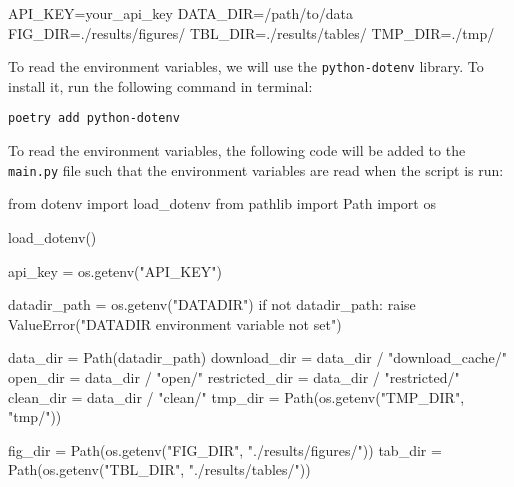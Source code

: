 \documentclass[
  letterpaper,
  DIV=11,
  numbers=noendperiod]{scrartcl}
\newenvironment{Shaded}{\begin{snugshade}}{\end{snugshade}}
\newcommand{\ControlFlowTok}[1]{\textcolor[rgb]{0.00,0.23,0.31}{#1}}
\newcommand{\ImportTok}[1]{\textcolor[rgb]{0.00,0.46,0.62}{#1}}
\newcommand{\KeywordTok}[1]{\textcolor[rgb]{0.00,0.23,0.31}{#1}}
\newcommand{\NormalTok}[1]{\textcolor[rgb]{0.00,0.23,0.31}{#1}}
\newcommand{\OperatorTok}[1]{\textcolor[rgb]{0.37,0.37,0.37}{#1}}
\newcommand{\PreprocessorTok}[1]{\textcolor[rgb]{0.68,0.00,0.00}{#1}}
\newcommand{\StringTok}[1]{\textcolor[rgb]{0.13,0.47,0.30}{#1}}
\begin{document}
\begin{Shaded}
\begin{Highlighting}[]
\NormalTok{API\_KEY}\OperatorTok{=}\NormalTok{your\_api\_key}
\NormalTok{DATA\_DIR}\OperatorTok{=/}\NormalTok{path}\OperatorTok{/}\NormalTok{to}\OperatorTok{/}\NormalTok{data}
\NormalTok{FIG\_DIR}\OperatorTok{=}\NormalTok{.}\OperatorTok{/}\NormalTok{results}\OperatorTok{/}\NormalTok{figures}\OperatorTok{/}
\NormalTok{TBL\_DIR}\OperatorTok{=}\NormalTok{.}\OperatorTok{/}\NormalTok{results}\OperatorTok{/}\NormalTok{tables}\OperatorTok{/}
\NormalTok{TMP\_DIR}\OperatorTok{=}\NormalTok{.}\OperatorTok{/}\NormalTok{tmp}\OperatorTok{/}
\end{Highlighting}
\end{Shaded}

To read the environment variables, we will use the
\texttt{python-dotenv} library. To install it, run the following command
in terminal:

\texttt{poetry\ add\ python-dotenv}

To read the environment variables, the following code will be added to
the \texttt{main.py} file such that the environment variables are read
when the script is run:

\begin{Shaded}
\begin{Highlighting}[]
\ImportTok{from}\NormalTok{ dotenv }\ImportTok{import}\NormalTok{ load\_dotenv}
\ImportTok{from}\NormalTok{ pathlib }\ImportTok{import}\NormalTok{ Path }
\ImportTok{import}\NormalTok{ os}

\NormalTok{load\_dotenv()}

\NormalTok{api\_key }\OperatorTok{=}\NormalTok{ os.getenv(}\StringTok{"API\_KEY"}\NormalTok{)}

\NormalTok{datadir\_path }\OperatorTok{=}\NormalTok{ os.getenv(}\StringTok{"DATADIR"}\NormalTok{)}
\ControlFlowTok{if} \KeywordTok{not}\NormalTok{ datadir\_path:}
    \ControlFlowTok{raise} \PreprocessorTok{ValueError}\NormalTok{(}\StringTok{"DATADIR environment variable not set"}\NormalTok{)}

\NormalTok{data\_dir }\OperatorTok{=}\NormalTok{ Path(datadir\_path)}
\NormalTok{download\_dir }\OperatorTok{=}\NormalTok{ data\_dir }\OperatorTok{/} \StringTok{"download\_cache/"}
\NormalTok{open\_dir }\OperatorTok{=}\NormalTok{ data\_dir }\OperatorTok{/} \StringTok{"open/"}
\NormalTok{restricted\_dir }\OperatorTok{=}\NormalTok{ data\_dir }\OperatorTok{/} \StringTok{"restricted/"}
\NormalTok{clean\_dir }\OperatorTok{=}\NormalTok{ data\_dir }\OperatorTok{/} \StringTok{"clean/"}
\NormalTok{tmp\_dir }\OperatorTok{=}\NormalTok{ Path(os.getenv(}\StringTok{"TMP\_DIR"}\NormalTok{, }\StringTok{"tmp/"}\NormalTok{))}

\NormalTok{fig\_dir }\OperatorTok{=}\NormalTok{ Path(os.getenv(}\StringTok{"FIG\_DIR"}\NormalTok{, }\StringTok{"./results/figures/"}\NormalTok{))}
\NormalTok{tab\_dir }\OperatorTok{=}\NormalTok{ Path(os.getenv(}\StringTok{"TBL\_DIR"}\NormalTok{, }\StringTok{"./results/tables/"}\NormalTok{))}
\end{Highlighting}
\end{Shaded}
\end{document}
